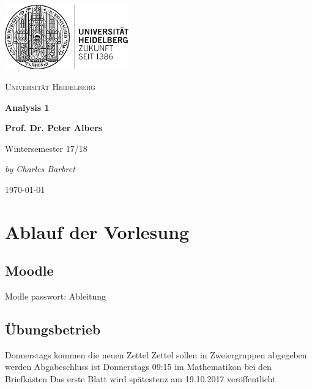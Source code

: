 \documentclass[12pt,a4paper]{article} %
\begin{document}
	\begin{titlepage} %
	\centering
	\includegraphics[width=0.40\textwidth]{UniLogo}\par\vspace{1cm}
		{\scshape\LARGE Universität Heidelberg \par}
		\vspace{1cm}
		{\Huge\bfseries Analysis 1 \par}
		\vspace{1cm}
		{\LARGE\bfseries Prof. Dr. Peter Albers \par}
		\vspace{1cm}
		{\huge Wintersemester 17/18 \par}
		\vspace{2cm}
		{\Large\itshape by Charles Barbret \par}
		
		\vfill

		{\large \gerDate\today\par}
	\end{titlepage}

\tableofcontents %
\newpage %
\setcounter{section}{-1}
\section{Ablauf der Vorlesung}
\subsection{Moodle}
Modle passwort: Ableitung
\subsection{Übungsbetrieb}
Donnerstags kommen die neuen Zettel \newline
Zettel sollen in Zweiergruppen abgegeben werden \newline
Abgabeschluss ist Donnerstags 09:15 im Mathematikon bei den Briefkästen \newline
Das erste Blatt wird spätestenz am 19.10.2017 veröffentlicht 
\end{document}
